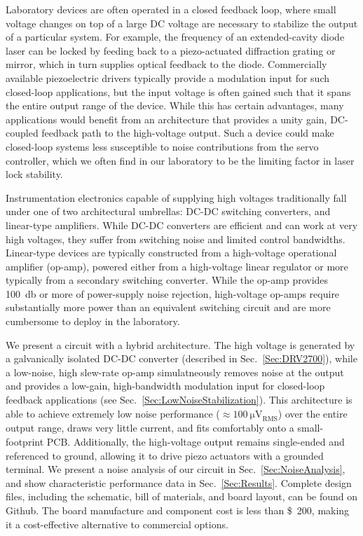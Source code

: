 \documentclass[aip,rsi,reprint]{revtex4-1} %
\begin{document}
Laboratory devices are often operated in a closed feedback loop, where small voltage changes on top of a large DC voltage are necessary to stabilize the output of a particular system.
For example, the frequency of an extended-cavity diode laser can be locked by feeding back to a piezo-actuated diffraction grating or mirror, which in turn supplies optical feedback to the diode.
Commercially available piezoelectric drivers typically provide a modulation input for  such closed-loop applications, but  the input voltage is often gained such that it spans the entire output range of the device.
While this has certain advantages, many applications would benefit from an architecture that provides a unity gain, DC-coupled feedback path to the high-voltage output. 
Such a device could make closed-loop systems less susceptible to noise contributions from the servo controller, which we often find in our laboratory to be the limiting factor in laser lock stability.

Instrumentation electronics capable of supplying high voltages traditionally fall under one of two architectural umbrellas: DC-DC switching converters, and linear-type amplifiers.
While DC-DC converters are efficient and can work at very high voltages, they suffer from switching noise and limited control bandwidths.
Linear-type devices are typically constructed from a high-voltage operational amplifier (op-amp), powered either from a high-voltage linear regulator or more typically from a secondary switching converter.
While the op-amp provides \SI{100}{\decibel} or more of power-supply noise rejection, high-voltage op-amps require substantially more power than an equivalent switching circuit and are more cumbersome to deploy in the laboratory.

We present a circuit with a hybrid architecture.
The high voltage is generated by a galvanically isolated DC-DC converter (described in Sec.~\ref{Sec:DRV2700}), while a low-noise, high slew-rate op-amp simulatneously removes noise at the output and provides a low-gain, high-bandwidth modulation input for closed-loop feedback applications  (see Sec.~\ref{Sec:LowNoiseStabilization}).
This architecture is able to achieve extremely low noise performance ($\approx\SI{100}{\micro\volt}_{\text{RMS}}$) over the entire output range, draws very little current, and fits comfortably onto a small-footprint PCB.
Additionally, the high-voltage output remains single-ended and referenced to ground, allowing it to drive piezo actuators with a grounded terminal.
We present a noise analysis of our circuit in Sec.~\ref{Sec:NoiseAnalysis}, and show characteristic performance data in Sec.~\ref{Sec:Results}.
Complete design files, including the schematic, bill of materials, and board layout, can be found on Github.\cite{PiezoDesignFiles}
The board manufacture and component cost is less than \SI{200}[\$]{}, making it a cost-effective alternative to commercial options. 
\end{document}
